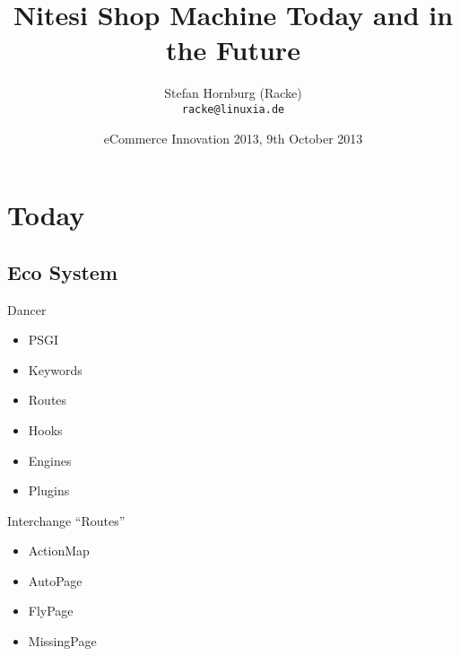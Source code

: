\usepackage[utf8]{inputenc}
\usepackage[T1]{fontenc}
\usepackage{mathptmx}
\usepackage[scaled=.90]{helvet}
\usepackage{courier}
\usepackage{caption}
\captionsetup{labelformat=empty,labelsep=none}
\usepackage{beamerthemesplit}
\usepackage{verbatim}
\usepackage{hyperref}
\usepackage{listings}
\lstset{language=Perl,basicstyle=\normalsize,tabsize=3,showstringspaces=false}

\title{Nitesi Shop Machine Today and in the Future}
\author[racke]{Stefan Hornburg (Racke)\\ \texttt{racke@linuxia.de}}
\date{eCommerce Innovation 2013, 9th October 2013}


\maketitle{}

\begin{frame}
  \titlepage
\end{frame}

\tableofcontents

\section{Today}

\subsection{Eco System}

\begin{frame}{Dancer}
\begin{itemize}
\item PSGI
\item Keywords
\item Routes
\item Hooks
\item Engines
\item Plugins
\end{itemize}
\end{frame}

\begin{frame}{Interchange ``Routes''}
\begin{itemize}
\item ActionMap
\item AutoPage
\item FlyPage
\item MissingPage
\end{itemize}
\end{frame}

